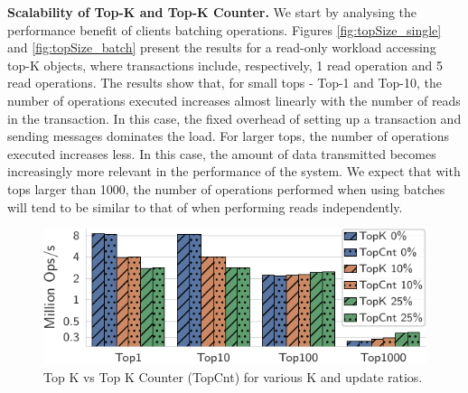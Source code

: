 \documentclass[sigplan,twocolumn,review,anonymous]{acmart}
\begin{document}
\noindent
\textbf{Scalability of Top-K and Top-K Counter.} %
We start by analysing the performance benefit of clients batching operations. %
Figures \ref{fig:topSize_single} and \ref{fig:topSize_batch} present the results for a read-only workload accessing
top-K objects, where transactions include, respectively, 1 read operation and 5 read operations.
The results show that, for small tops - Top-1 and Top-10, the number of operations executed increases almost
linearly with the number of reads in the transaction. In this case, the fixed overhead of setting 
up a transaction and sending messages dominates the load. 
For larger tops, the number of operations executed increases less. In this case, the amount of data 
transmitted becomes increasingly more relevant in the performance of the system.
We expect that with tops larger than 1000, the number of operations performed when using batches will 
tend to be similar to that of when performing reads independently.


%
%
%


\begin{figure}
	\centering
	\includegraphics[width=0.76\linewidth]{singleQuery/topk_vs_topsum_5b}
	\vspace*{-0.6em}
	\caption{Top K vs Top K Counter (TopCnt) for various K and update ratios.}
	\label{fig:topKVSTopSum}
	\vspace*{-0.75em}
\end{figure}
\end{document}
